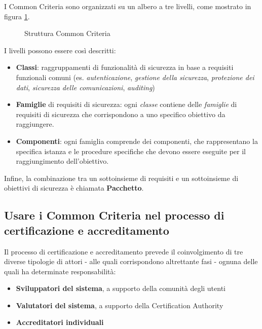 \documentclass[../main.tex]{subfiles}
\begin{document}
I Common Criteria sono organizzati su un albero a tre livelli, come mostrato in figura \ref{fig:FigCCStruct}.
\begin{figure}[H]
   \centering
   \caption{Struttura Common Criteria \cite{SyntegraCC}}\label{fig:FigCCStruct}
\end{figure}
I livelli possono essere così descritti:
\begin{itemize}
\item \textbf{Classi}: raggruppamenti di funzionalità di sicurezza in base a requisiti funzionali comuni (es. \textit{autenticazione}, \textit{gestione della sicurezza}, \textit{protezione dei dati}, \textit{ sicurezza delle comunicazioni}, \textit{auditing})
\item \textbf{Famiglie} di requisiti di sicurezza: ogni \textit{classe} contiene delle \textit{famiglie} di requisiti di sicurezza che corrispondono a uno specifico obiettivo da raggiungere.
\item \textbf{Componenti}: ogni famiglia comprende dei componenti, che rappresentano la specifica istanza e le procedure specifiche che devono essere eseguite per il raggiungimento dell'obiettivo.
\end{itemize}
Infine, la combinazione tra un sottoinsieme di requisiti e un sottoinsieme di obiettivi di sicurezza è chiamata \textbf{Pacchetto}.

\subsection{Usare i Common Criteria nel processo di certificazione e accreditamento}
Il processo di certificazione e accreditamento prevede il coinvolgimento di tre diverse tipologie di attori - alle quali corrispondono altrettante fasi - ognuna delle quali ha determinate responsabilità:
\begin{itemize}
\item \textbf{Sviluppatori del sistema}, a supporto della comunità degli utenti
\item \textbf{Valutatori del sistema}, a supporto della Certification Authority
\item \textbf{Accreditatori individuali}
\end{itemize}
\end{document}
